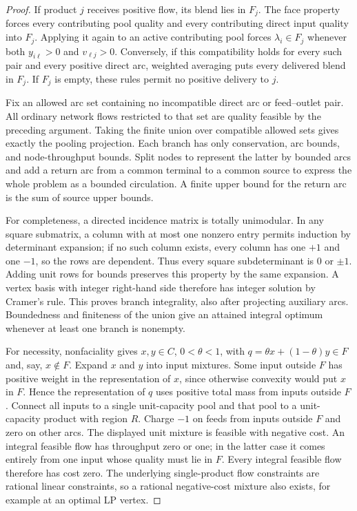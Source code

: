 \begin{proof}
If product $j$ receives positive flow, its blend lies in $F_j$.
The face property forces every contributing pool quality and every
contributing direct input quality into $F_j$. Applying it again to
an active contributing pool forces $\lambda_i\in F_j$ whenever both
$y_{i\ell}>0$ and $v_{\ell j}>0$. Conversely, if this compatibility
holds for every such pair and every positive direct arc, weighted
averaging puts every delivered blend in $F_j$. If $F_j$ is empty,
these rules permit no positive delivery to $j$.

Fix an allowed arc set containing no incompatible direct arc or feed--outlet
pair. All ordinary network flows restricted to that set are quality
feasible by the preceding argument. Taking the finite union over
compatible allowed sets gives exactly the pooling projection. Each
branch has only conservation, arc bounds, and node-throughput bounds.
Split nodes to represent the latter by bounded arcs and add a return
arc from a common terminal to a common source to express the whole
problem as a bounded circulation. A finite upper bound for the return
arc is the sum of source upper bounds.

For completeness, a directed incidence matrix is totally unimodular.
In any square submatrix, a column with at most one nonzero entry permits
induction by determinant expansion; if no such column exists, every
column has one $+1$ and one $-1$, so the rows are dependent. Thus every
square subdeterminant is $0$ or $\pm1$. Adding unit rows for bounds
preserves this property by the same expansion. A vertex basis with
integer right-hand side therefore has integer solution by Cramer's rule.
This proves branch integrality, also after projecting auxiliary arcs.
Boundedness and finiteness of the union give an attained integral optimum
whenever at least one branch is nonempty.

For necessity, nonfaciality gives $x,y\in C$, $0<\theta<1$, with
$q=\theta x+(1-\theta)y\in F$ and, say, $x\notin F$. Expand $x$ and
$y$ into input mixtures. Some input outside $F$ has positive weight
in the representation of $x$, since otherwise convexity would put $x$
in $F$. Hence the representation of $q$ uses positive total mass from
inputs outside $F$. Connect all inputs to a single unit-capacity pool
and that pool to a unit-capacity product with region $R$. Charge $-1$
on feeds from inputs outside $F$ and zero on other arcs. The displayed
unit mixture is feasible with negative cost. An integral feasible flow
has throughput zero or one; in the latter case it comes entirely from
one input whose quality must lie in $F$. Every integral feasible flow
therefore has cost zero. The underlying single-product flow constraints
are rational linear constraints, so a rational negative-cost mixture
also exists, for example at an optimal LP vertex.
\end{proof}

